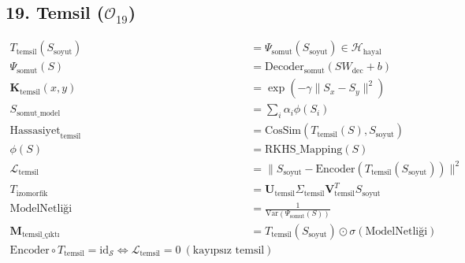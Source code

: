 \documentclass[11pt, a4paper]{article}
\begin{document}
\subsection{19. Temsil ($\mathcal{O}_{19}$)}
\begin{align}
T_{\text{temsil}}(S_{\text{soyut}}) &= \Psi_{\text{somut}}(S_{\text{soyut}}) \in \mathcal{H}_{\text{hayal}} \\
\Psi_{\text{somut}}(S) &= \text{Decoder}_{\text{somut}}(S W_{\text{dec}} + b) \\
\mathbf{K}_{\text{temsil}}(x, y) &= \exp\left( -\gamma \|S_x - S_y\|^2 \right) \\
S_{\text{somut\_model}} &= \sum_i \alpha_i \phi(S_i) \\
\text{Hassasiyet}_{\text{temsil}} &= \text{CosSim}\left(T_{\text{temsil}}(S), S_{\text{soyut}}\right) \\
\phi(S) &= \text{RKHS\_Mapping}(S) \\
\mathcal{L}_{\text{temsil}} &= \| S_{\text{soyut}} - \text{Encoder}(T_{\text{temsil}}(S_{\text{soyut}})) \|^2 \\
T_{\text{izomorfik}} &= \mathbf{U}_{\text{temsil}} \Sigma_{\text{temsil}} \mathbf{V}_{\text{temsil}}^T S_{\text{soyut}} \\
\text{ModelNetliği} &= \frac{1}{\text{Var}(\Psi_{\text{somut}}(S))} \\
\mathbf{M}_{\text{temsil\_çıktı}} &= T_{\text{temsil}}(S_{\text{soyut}}) \odot \sigma(\text{ModelNetliği}) \\
\text{Encoder} \circ T_{\text{temsil}} = \mathrm{id}_{\mathcal{S}} \iff \mathcal{L}_{\text{temsil}} = 0 \ (\text{kayıpsız temsil})
\end{align}
\end{document}
